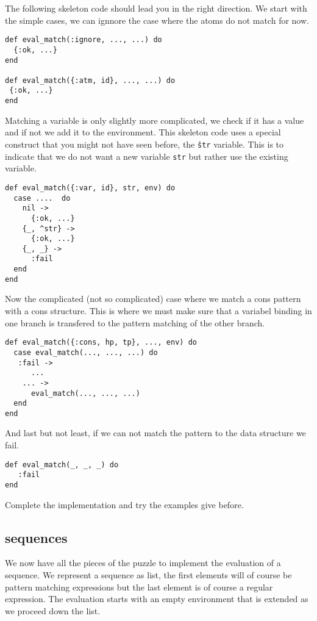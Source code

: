 \documentclass[a4paper,11pt]{article}
\begin{document}
The following skeleton code should lead you in the right direction. We
start with the simple cases, we can ignnore the case where the atoms
do not match for now.

\begin{verbatim}
def eval_match(:ignore, ..., ...) do
  {:ok, ...}
end

def eval_match({:atm, id}, ..., ...) do
 {:ok, ...}
end
\end{verbatim}

Matching a variable is only slightly more complicated, we check if it
has a value and if not we add it to the environment. This skeleton
code uses a special construct that you might not have seen before, the
{\tt \^str} variable. This is to indicate that we do not want a new
variable {\tt str} but rather use the existing variable. 

\begin{verbatim}
def eval_match({:var, id}, str, env) do
  case ....  do
    nil ->
      {:ok, ...}
    {_, ^str} ->
      {:ok, ...}
    {_, _} ->
      :fail
  end
end
\end{verbatim}

Now the complicated (not so complicated) case where we match a cons
pattern with a cons structure. This is where we must make sure that a
variabel binding in one branch is transfered to the pattern matching
of the other branch.

\begin{verbatim}
def eval_match({:cons, hp, tp}, ..., env) do
  case eval_match(..., ..., ...) do
   :fail ->
      ...
    ... ->
      eval_match(..., ..., ...)
  end
end
\end{verbatim}

And last but not least, if we can not match the pattern to the data
structure we fail.

\begin{verbatim}
def eval_match(_, _, _) do
   :fail
end
\end{verbatim}

Complete the implementation and try the examples give before. 

\subsection{sequences}

We now have all the pieces of the puzzle to implement the evaluation
of a sequence. We represent a sequence as list, the first elements
will of course be pattern matching expressions but the last element is
of course a regular expression. The evaluation starts with an empty
environment that is extended as we proceed down the list.
\end{document}
